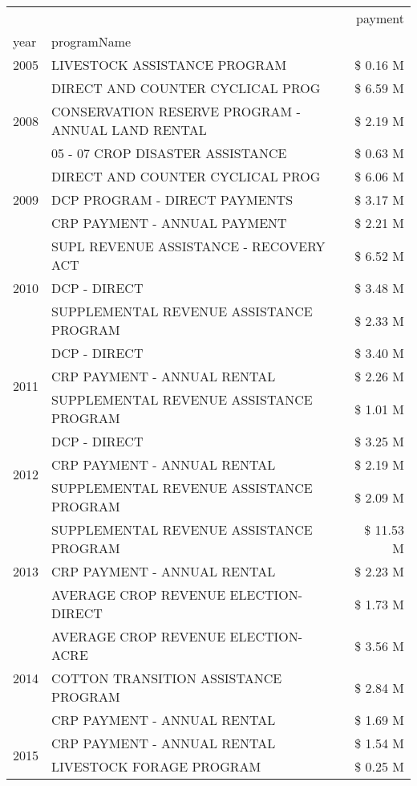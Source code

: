 \begin{tabular}{llr}
\toprule
 &  & payment \\
year & programName &  \\
\midrule
2005 & LIVESTOCK ASSISTANCE PROGRAM & \$ 0.16 M \\
\cline{1-3}
\multirow[t]{3}{*}{2008} & DIRECT AND COUNTER CYCLICAL PROG & \$ 6.59 M \\
 & CONSERVATION RESERVE PROGRAM - ANNUAL LAND RENTAL & \$ 2.19 M \\
 & 05 - 07 CROP DISASTER ASSISTANCE & \$ 0.63 M \\
\cline{1-3}
\multirow[t]{3}{*}{2009} & DIRECT AND COUNTER CYCLICAL PROG & \$ 6.06 M \\
 & DCP PROGRAM - DIRECT PAYMENTS & \$ 3.17 M \\
 & CRP PAYMENT - ANNUAL PAYMENT & \$ 2.21 M \\
\cline{1-3}
\multirow[t]{3}{*}{2010} & SUPL REVENUE ASSISTANCE - RECOVERY ACT & \$ 6.52 M \\
 & DCP - DIRECT & \$ 3.48 M \\
 & SUPPLEMENTAL REVENUE ASSISTANCE PROGRAM & \$ 2.33 M \\
\cline{1-3}
\multirow[t]{3}{*}{2011} & DCP - DIRECT & \$ 3.40 M \\
 & CRP PAYMENT - ANNUAL RENTAL & \$ 2.26 M \\
 & SUPPLEMENTAL REVENUE ASSISTANCE PROGRAM & \$ 1.01 M \\
\cline{1-3}
\multirow[t]{3}{*}{2012} & DCP - DIRECT & \$ 3.25 M \\
 & CRP PAYMENT - ANNUAL RENTAL & \$ 2.19 M \\
 & SUPPLEMENTAL REVENUE ASSISTANCE PROGRAM & \$ 2.09 M \\
\cline{1-3}
\multirow[t]{3}{*}{2013} & SUPPLEMENTAL REVENUE ASSISTANCE PROGRAM & \$ 11.53 M \\
 & CRP PAYMENT - ANNUAL RENTAL & \$ 2.23 M \\
 & AVERAGE CROP REVENUE ELECTION-DIRECT & \$ 1.73 M \\
\cline{1-3}
\multirow[t]{3}{*}{2014} & AVERAGE CROP REVENUE ELECTION-ACRE & \$ 3.56 M \\
 & COTTON TRANSITION ASSISTANCE PROGRAM & \$ 2.84 M \\
 & CRP PAYMENT - ANNUAL RENTAL & \$ 1.69 M \\
\cline{1-3}
\multirow[t]{3}{*}{2015} & CRP PAYMENT - ANNUAL RENTAL & \$ 1.54 M \\
 & LIVESTOCK FORAGE PROGRAM & \$ 0.25 M \\

\end{tabular}
